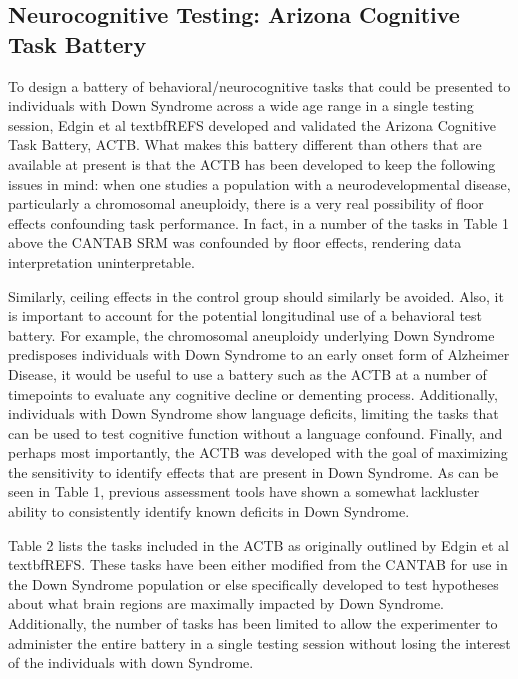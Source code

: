 \documentclass{article}
\begin{document}
\subsection{Neurocognitive Testing: Arizona Cognitive Task Battery
}
To design a battery of behavioral/neurocognitive tasks that could be presented to individuals with Down Syndrome across a wide age range in a single testing session, Edgin et al textbf{REFS} developed and validated the Arizona Cognitive Task Battery, ACTB. What makes this battery different than others that are available at present is that the ACTB has been developed to keep the following issues in mind: when one studies a population with a neurodevelopmental disease, particularly a chromosomal aneuploidy, there is a very real possibility of floor effects confounding task performance. In fact, in a number of the tasks in Table 1 above the CANTAB SRM was confounded by floor effects, rendering data interpretation uninterpretable.

Similarly, ceiling effects in the control group should similarly be avoided. Also, it is important to account for the potential longitudinal use of a behavioral test battery. For example, the chromosomal aneuploidy underlying Down Syndrome predisposes individuals with Down Syndrome to an early onset form of Alzheimer Disease, it would be useful to use a battery such as the ACTB at a number of timepoints to evaluate any cognitive decline or dementing process. Additionally, individuals with Down Syndrome show language deficits, limiting the tasks that can be used to test cognitive function without a language confound. Finally, and perhaps most importantly, the ACTB was developed with the goal of maximizing the sensitivity to identify effects that are present in Down Syndrome. As can be seen in Table 1, previous assessment tools have shown a somewhat lackluster ability to consistently identify known deficits in Down Syndrome.

Table 2 lists the tasks included in the ACTB as originally outlined by Edgin et al textbf{REFS}. These tasks have been either modified from the CANTAB for use in the Down Syndrome population or else specifically developed to test hypotheses about what brain regions are maximally impacted by Down Syndrome. Additionally, the number of tasks has been limited to allow the experimenter to administer the entire battery in a single testing session without losing the interest of the individuals with down Syndrome.
\end{document}
